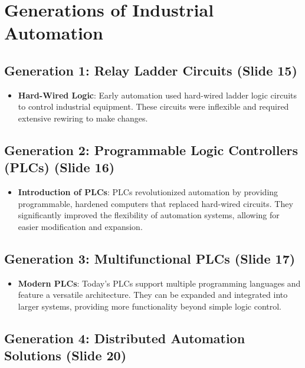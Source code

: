 \documentclass[
  14pt,
  a4paper,
  numbers=noendperiod,
  headinclude=true,
  footinclude=true,
  DIV=calc]{scrreprt}
\providecommand{\tightlist}{%
  \setlength{\itemsep}{0pt}\setlength{\parskip}{0pt}}\usepackage{longtable,booktabs,array}
\begin{document}
\section{Generations of Industrial
Automation}\label{generations-of-industrial-automation}

\subsection{Generation 1: Relay Ladder Circuits (Slide
15)}\label{generation-1-relay-ladder-circuits-slide-15}

\begin{itemize}
\tightlist
\item
  \textbf{Hard-Wired Logic}: Early automation used hard-wired ladder
  logic circuits to control industrial equipment. These circuits were
  inflexible and required extensive rewiring to make changes.
\end{itemize}

\subsection{Generation 2: Programmable Logic Controllers (PLCs) (Slide
16)}\label{generation-2-programmable-logic-controllers-plcs-slide-16}

\begin{itemize}
\tightlist
\item
  \textbf{Introduction of PLCs}: PLCs revolutionized automation by
  providing programmable, hardened computers that replaced hard-wired
  circuits. They significantly improved the flexibility of automation
  systems, allowing for easier modification and expansion.
\end{itemize}

\subsection{Generation 3: Multifunctional PLCs (Slide
17)}\label{generation-3-multifunctional-plcs-slide-17}

\begin{itemize}
\tightlist
\item
  \textbf{Modern PLCs}: Today's PLCs support multiple programming
  languages and feature a versatile architecture. They can be expanded
  and integrated into larger systems, providing more functionality
  beyond simple logic control.
\end{itemize}

\subsection{Generation 4: Distributed Automation Solutions (Slide
20)}\label{generation-4-distributed-automation-solutions-slide-20}
\end{document}
